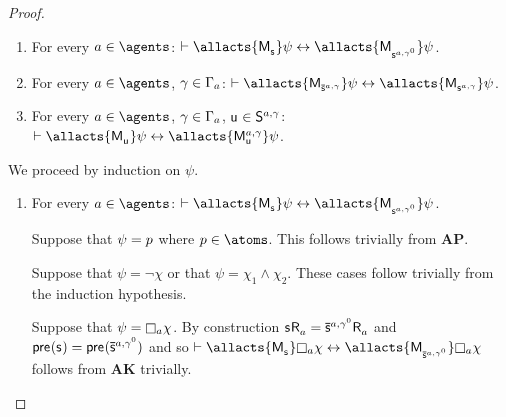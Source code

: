 \begin{proof}
\begin{enumerate}
    \item For every $\agentA \in \agents$: $\proves \allacts{\aPModel{\aStateS}} \psi \iff \allacts{\aPModel{\aStateS[\agentA,\gamma^0]}} \psi$.
    \item For every $\agentA \in \agents$, $\gamma \in \Gamma_a$: $\proves \allacts{\aPModel{\aPStateS[\agentA,\gamma]}} \psi \iff \allacts{\aPModel{\aStateS[\agentA,\gamma]}} \psi$.
    \item For every $\agentA \in \agents$, $\gamma \in \Gamma_a$, $\aStateU \in \aStates[\agentA,\gamma]$: $\proves \allacts{\aPModel{\aStateU}} \psi \iff \allacts{\aPModel[\agentA,\gamma]{\aStateU}} \psi$.
\end{enumerate}

We proceed by induction on $\psi$.

\begin{enumerate}
    \item For every $\agentA \in \agents$: $\proves \allacts{\aPModel{\aStateS}} \psi \iff \allacts{\aPModel{\aStateS[\agentA,\gamma^0]}} \psi$.

        Suppose that $\psi = p$ where $\atomP \in \atoms$. 
        This follows trivially from {\bf AP}.

        Suppose that $\psi = \neg \chi$ or that $\psi = \chi_1 \land \chi_2$.
        These cases follow trivially from the induction hypothesis.

        Suppose that $\psi = \necessaryA \chi$.
        By construction $\aStateS \aAccessibility{\agentA} = \aPStateS[\agentA,\gamma^0] \aAccessibility{\agentA}$ and $\aPrecondition(\aStateS) = \aPrecondition(\aPStateS[\agentA,\gamma^0])$ and so $\proves \allacts{\aPModel{\aStateS}} \necessaryA \chi \iff \allacts{\aPModel{\aPStateS[\agentA,\gamma^0]}} \necessaryA \chi$ follows from {\bf AK} trivially.


\end{enumerate}
\end{proof}
